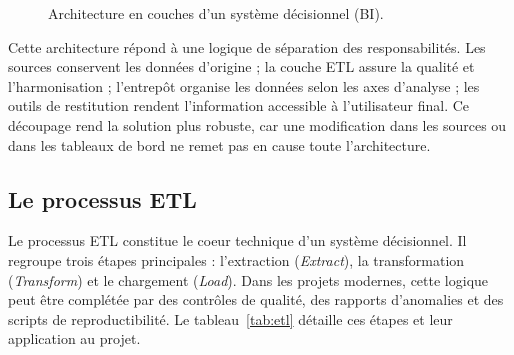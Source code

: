 \begin{figure}[H]
\centering
{}
\caption[Architecture en couches d'un système décisionnel]{Architecture en couches d'un système décisionnel (BI).}
\label{fig:bichain}
\end{figure}

\par Cette architecture répond à une logique de séparation des responsabilités.
Les sources conservent les données d'origine ; la couche ETL assure la qualité et
l'harmonisation ; l'entrepôt organise les données selon les axes d'analyse ; les
outils de restitution rendent l'information accessible à l'utilisateur final. Ce
découpage rend la solution plus robuste, car une modification dans les sources
ou dans les tableaux de bord ne remet pas en cause toute l'architecture.

\subsection{Le processus ETL}
\par Le processus \ac{ETL} constitue le coeur technique d'un système
décisionnel. Il regroupe trois étapes principales : l'extraction
(\textit{Extract}), la transformation (\textit{Transform}) et le chargement
(\textit{Load}). Dans les projets modernes, cette logique peut être complétée par
des contrôles de qualité, des rapports d'anomalies et des scripts de
reproductibilité. Le tableau~\ref{tab:etl} détaille ces étapes et leur
application au projet.

